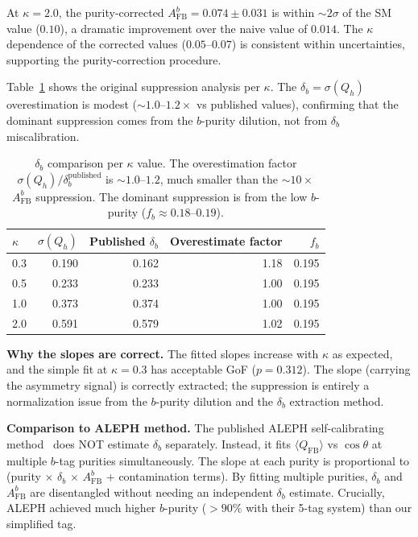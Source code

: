 \documentclass[11pt,a4paper]{article}
\begin{document}
At $\kappa = 2.0$, the purity-corrected $A_\mathrm{FB}^b = 0.074 \pm 0.031$ is within
$\sim 2\sigma$ of the SM value ($0.10$), a dramatic improvement over the naive value
of $0.014$. The $\kappa$ dependence of the corrected values ($0.05$--$0.07$) is
consistent within uncertainties, supporting the purity-correction procedure.

Table~\ref{tab:delta_b_suppression} shows the original suppression analysis per $\kappa$.
The $\delta_b = \sigma(Q_h)$ overestimation is modest ($\sim 1.0$--$1.2\times$ vs
published values), confirming that the dominant suppression comes from the $b$-purity
dilution, not from $\delta_b$ miscalibration.

\begin{table}[htbp]
\centering
\caption{$\delta_b$ comparison per $\kappa$ value. The overestimation factor
$\sigma(Q_h) / \delta_b^\mathrm{published}$ is $\sim 1.0$--$1.2$, much smaller
than the $\sim 10\times$ $A_\mathrm{FB}^b$ suppression. The dominant suppression
is from the low $b$-purity ($f_b \approx 0.18$--$0.19$).}
\label{tab:delta_b_suppression}
\begin{tabular}{lrrrr}
\toprule
$\kappa$ & $\sigma(Q_h)$ & Published $\delta_b$ & Overestimate factor & $f_b$ \\
\midrule
0.3 & 0.190 & 0.162 & 1.18 & 0.195 \\
0.5 & 0.233 & 0.233 & 1.00 & 0.195 \\
1.0 & 0.373 & 0.374 & 1.00 & 0.195 \\
2.0 & 0.591 & 0.579 & 1.02 & 0.195 \\
\bottomrule
\end{tabular}
\end{table}

\textbf{Why the slopes are correct.} The fitted slopes increase with $\kappa$ as
expected, and the simple fit at $\kappa = 0.3$ has acceptable GoF ($p = 0.312$).
The slope (carrying the asymmetry signal) is correctly extracted; the suppression
is entirely a normalization issue from the $b$-purity dilution and the
$\delta_b$ extraction method.

\textbf{Comparison to ALEPH method.} The published ALEPH self-calibrating
method~\cite{ALEPH:AFBb} does NOT estimate $\delta_b$ separately. Instead, it fits
$\langle Q_\mathrm{FB} \rangle$ vs $\cos\theta$ at multiple $b$-tag purities
simultaneously. The slope at each purity is proportional to
(purity $\times$ $\delta_b$ $\times$ $A_\mathrm{FB}^b$ + contamination terms).
By fitting multiple purities, $\delta_b$ and $A_\mathrm{FB}^b$ are disentangled
without needing an independent $\delta_b$ estimate. Crucially, ALEPH achieved
much higher $b$-purity ($> 90\%$ with their 5-tag system) than our simplified tag.
\end{document}
